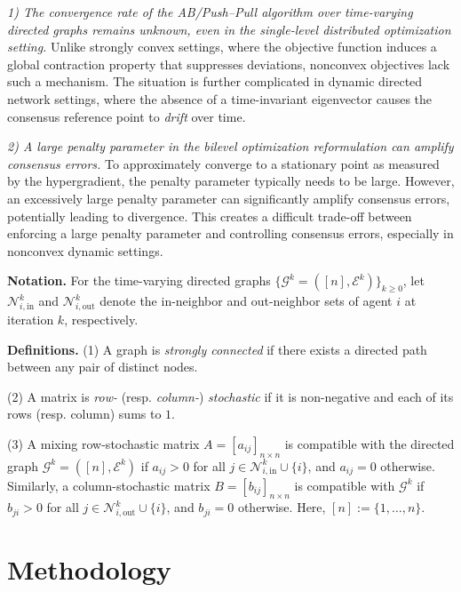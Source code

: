 \documentclass{article}
\theoremstyle{plain}
\theoremstyle{definition}
\theoremstyle{remark}
\begin{document}
\textit{1) The convergence rate of the AB/Push–Pull algorithm over time-varying directed graphs remains unknown, even in the single-level distributed optimization setting.}
Unlike strongly convex settings, where the objective function induces a global contraction property that suppresses deviations, nonconvex objectives lack such a mechanism.
The situation is further complicated in dynamic directed network settings, where the absence of a time-invariant eigenvector causes the consensus reference point to \textit{drift} over time. 

\textit{2) A large penalty parameter in the bilevel optimization reformulation can amplify consensus errors.} 
To approximately converge to a stationary point as measured by the hypergradient, the penalty parameter typically needs to be large. However, an excessively large penalty parameter can significantly amplify consensus errors, potentially leading to divergence. This creates a difficult trade-off between enforcing a large penalty parameter and controlling consensus errors, especially in nonconvex dynamic settings.

\textbf{Notation.} For the time-varying directed graphs $\{\mathcal{G}^{k}=([n],\mathcal{E}^{k})\}_{k \ge 0}$, let $\mathcal{N}_{i,\mathrm{in}}^{k}$ and $\mathcal{N}_{i,\mathrm{out}}^{k}$ denote the in-neighbor and out-neighbor sets of agent $i$ at iteration $k$, respectively. 

\textbf{Definitions.} 
(1) A graph is \textit{strongly connected} if there exists a directed path between any pair of distinct nodes. 

(2) A matrix is \textit{row-} (resp. \textit{column-}) \textit{stochastic} if it is non-negative and each of its rows (resp. column) sums to $1$. 

(3) A mixing row-stochastic matrix $A=[a_{ij}]_{n\times n}$ is compatible with the directed graph $\mathcal{G}^{k}=([n],\mathcal{E}^{k})$ if $a_{ij}>0$ for all $j\in\mathcal{N}_{i,\mathrm{in}}^{k}\cup\{i\}$, and $a_{ij}=0$ otherwise. 
Similarly, a column-stochastic matrix $B=[b_{ij}]_{n\times n}$ is compatible with $\mathcal{G}^{k}$ if $b_{ji}>0$ for all $j\in\mathcal{N}_{i,\mathrm{out}}^{k}\cup\{i\}$, and $b_{ji}=0$ otherwise. Here, $[n]:=\{1, \dots, n\}$.

\section{Methodology}
\end{document}
